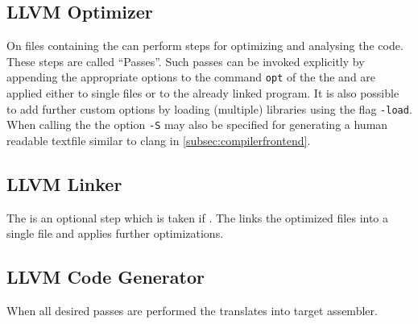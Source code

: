 \subsection{LLVM Optimizer}\label{subsec:optimizer}
On files containing \llvmir the \opt can perform steps for optimizing and analysing the code.
These steps are called \enquote{Passes}.
Such passes can be invoked explicitly by appending the appropriate options to the command \texttt{opt} of the the \opt and are applied either to single files or to the already linked program.
It is also possible to add further custom options by loading (multiple) libraries using the flag \texttt{-load}.
When calling the \opt the option \texttt{-S} may also be specified for generating a human readable textfile similar to clang in \autoref{subsec:compilerfrontend}.
\subsection{LLVM Linker}
The \linker is an optional step which is taken if .
The \linker links the optimized \llvmir files into a single \llvmir file and applies further optimizations.
\subsection{LLVM Code Generator}
When all desired passes are performed the \generator translates \llvmir into target assembler.
